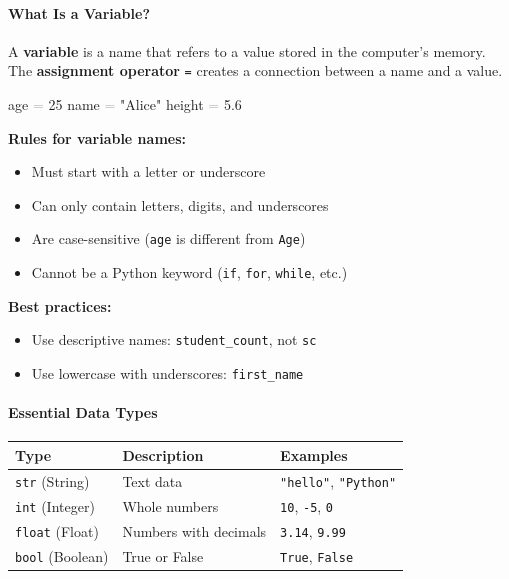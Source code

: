 \documentclass[
  justified,
  openright,
]{tufte-book}
\let\subsection\paragraph
\let\paragraph\paragraph
\newcommand{\StringTok}[1]{\textcolor{CodeString}{#1}}              %
\newcommand{\CodeNumTok}[1]{\textcolor{CodeNumber}{#1}}             %
\newcommand{\OperatorTok}[1]{\textcolor{DarkGray}{#1}}              %
\newenvironment{Shaded}{%
  \begin{mdframed}[style=TufteCode]%
}{%
  \end{mdframed}%
}
\let\subsection\paragraph
\let\paragraph\paragraph
\providecommand{\tightlist}{%
  \setlength{\itemsep}{0pt}\setlength{\parskip}{0pt}}
\begin{document}
\subsection{What Is a Variable?}\label{what-is-a-variable}

A \textbf{variable} is a name that refers to a value stored in the
computer's memory. The \textbf{assignment operator} \texttt{=} creates a
connection between a name and a value.

\begin{Shaded}
\begin{Highlighting}[]
age \OperatorTok{=} \CodeNumTok{25}
name \OperatorTok{=} \StringTok{"Alice"}
height \OperatorTok{=} \CodeNumTok{5.6}
\end{Highlighting}
\end{Shaded}

\textbf{Rules for variable names:}

\begin{itemize}
\tightlist
\item
  Must start with a letter or underscore
\item
  Can only contain letters, digits, and underscores
\item
  Are case-sensitive (\texttt{age} is different from \texttt{Age})
\item
  Cannot be a Python keyword (\texttt{if}, \texttt{for}, \texttt{while},
  etc.)
\end{itemize}

\textbf{Best practices:}

\begin{itemize}
\tightlist
\item
  Use descriptive names: \texttt{student\_count}, not \texttt{sc}
\item
  Use lowercase with underscores: \texttt{first\_name}
\end{itemize}

\subsection{Essential Data Types}\label{essential-data-types}

\begin{fullwidth}{\def\LTcaptype{none} %
\begin{longtable}[]{@{}lll@{}}
\toprule\noalign{}
Type & Description & Examples \\
\midrule\noalign{}
\endhead
\bottomrule\noalign{}
\endlastfoot
\texttt{str} (String) & Text data & \texttt{"hello"},
\texttt{"Python"} \\
\texttt{int} (Integer) & Whole numbers & \texttt{10}, \texttt{-5},
\texttt{0} \\
\texttt{float} (Float) & Numbers with decimals & \texttt{3.14},
\texttt{9.99} \\
\texttt{bool} (Boolean) & True or False & \texttt{True},
\texttt{False} \\
\end{longtable}
}
\end{fullwidth}
\end{document}
